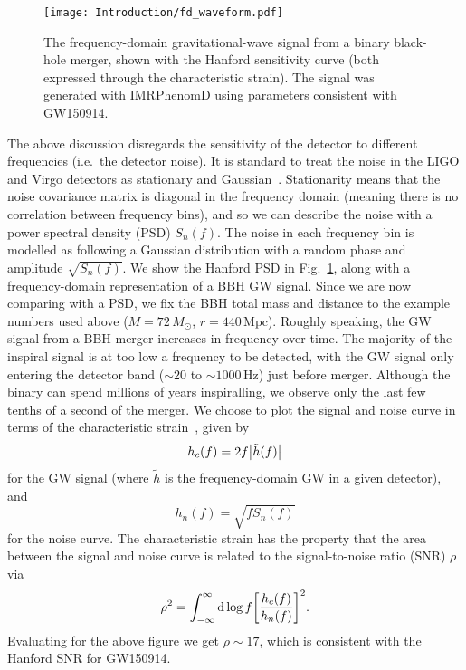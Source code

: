\begin{figure}[t]
	\centering
	\texttt{[image: Introduction/fd\_waveform.pdf]}
	\caption[The frequency-domain gravitational-wave signal from a binary black-hole merger]{ 
		The frequency-domain gravitational-wave signal from a binary black-hole merger, shown with the Hanford sensitivity curve (both expressed through the characteristic strain). The signal was generated with IMRPhenomD using parameters consistent with GW150914.}
	\label{fig:ch1:fd_waveform}
\end{figure}

The above discussion disregards the sensitivity of the detector to different frequencies (i.e.\ the detector noise).
It is standard to treat the noise in the LIGO and Virgo detectors as stationary and Gaussian~\cite{LIGOScientific:2019hgc}.
Stationarity means that the noise covariance matrix is diagonal in the frequency domain (meaning there is no correlation between frequency bins), and so we can describe the noise with a power spectral density (PSD) $S_n(f)$.
The noise in each frequency bin is modelled as following a Gaussian distribution with a random phase and amplitude $\sqrt{S_n(f)}$.
We show the Hanford PSD in Fig.~\ref{fig:ch1:fd_waveform}, along with a frequency-domain representation of a BBH GW signal. 
Since we are now comparing with a PSD, we fix the BBH total mass and distance to the example numbers used above ($M = 72\,M_\odot$, $r = 440\,\mathrm{Mpc}$).
Roughly speaking, the GW signal from a BBH merger increases in frequency over time.
The majority of the inspiral signal is at too low a frequency to be detected, with the GW signal only entering the detector band ($\sim 20$ to $\sim 1000\,\mathrm{Hz}$) just before merger.
Although the binary can spend millions of years inspiralling, we observe only the last few tenths of a second of the merger.
We choose to plot the signal and noise curve in terms of the characteristic strain~\cite{Moore:2014lga}, given by
\begin{equation}
    h_c(f) = 2f\abs{\tilde{h}(f)}
\end{equation}
for the GW signal (where $\tilde{h}$ is the frequency-domain GW in a given detector), and
\begin{equation}
    h_n(f) = \sqrt{fS_n(f)}
\end{equation}
for the noise curve.
The characteristic strain has the property that the area between the signal and noise curve is related to the signal-to-noise ratio (SNR) $\rho$ via
\begin{equation}
    \rho^2 = \int_{-\infty}^\infty \dd\log{f} \qty[\frac{h_c(f)}{h_n(f)}]^2.
\end{equation}
Evaluating for the above figure we get $\rho \sim 17$, which is consistent with the Hanford SNR for GW150914.


